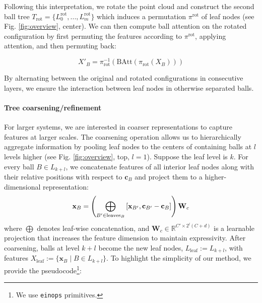 Following this interpretation, we rotate the point cloud and construct the second ball tree $T_\mathrm{rot} = \{ L_0^{\mathrm{rot}}, ..., L_m^{\mathrm{rot}} \}$ which induces a permutation $\pi^{\mathrm{rot}}$ of leaf nodes (see Fig. \ref{fig:overview}, center). We can then compute ball attention on the rotated configuration by first permuting the features according to $\pi^{\mathrm{rot}}$, applying attention, and then permuting back:

\begin{equation}
\label{eq:rot_ball_attention}
    X'_B = \pi^{-1}_{\mathrm{rot}} \left( \mathrm{BAtt}\left(\pi_{\mathrm{rot}} \left( X_B \right) \right) \right)
\end{equation}

By alternating between the original and rotated configurations in consecutive layers, we ensure the interaction between leaf nodes in otherwise separated balls.

\paragraph{Tree coarsening/refinement}
For larger systems, we are interested in coarser representations to capture features at larger scales. The coarsening operation allows us to hierarchically aggregate information by pooling leaf nodes to the centers of containing balls at $l$ levels higher (see Fig. \ref{fig:overview}, top, $l=1$). Suppose the leaf level is $k$. For every ball $B \in L_{k+l}$, we concatenate features of all interior leaf nodes along with their relative positions with respect to $\mathbf{c}_B$ and project them to a higher-dimensional representation:
\vspace{-3pt}
\begin{equation}
\vspace{-2pt}
   \mathbf{x}_B = \left( \bigoplus_{B' \in \mathrm{leaves}_B} \left[ \mathbf{x}_{B'}, \mathbf{c}_{B'} - \mathbf{c}_{B} \right] \right) \mathbf{W}_c
\end{equation}
where $\bigoplus$ denotes leaf-wise concatenation, and $\mathbf{W}_c \in \mathbb{R}^{C' \times 2^l(C + d)}$ is a learnable projection that increases the feature dimension to maintain expressivity. After coarsening, balls at level $k+l$ become the new leaf nodes, $L_\mathrm{leaf} := L_{k+l}$, with features $X_\mathrm{leaf} := \{\mathbf{x}_B \mid B \in L_{k+l}\}$. To highlight the simplicity of our method, we provide the pseudocode\footnote{We use \texttt{einops} \cite{rogozhnikov2022einops} primitives.}:

